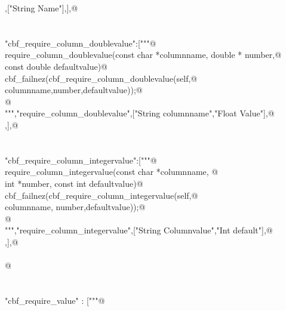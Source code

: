 \documentclass[10pt,a4paper,twoside,notitlepage]{article}
\begin{document}
\begin{flushleft}
\begin{list}{}{}
\mbox{},["String Name"],],@\\
\mbox{}\verb@@\\
\mbox{}\verb@@\\
\mbox{}\verb@"cbf_require_column_doublevalue":["""@\\
\mbox{}\verb@%apply double *OUTPUT { double *number} require_column_doublevalue;@\\
\mbox{}\verb@void require_column_doublevalue(const char *columnname, double * number,@\\
\mbox{}\verb@             const double defaultvalue){@\\
\mbox{}\verb@    cbf_failnez(cbf_require_column_doublevalue(self,@\\
\mbox{}\verb@                  columnname,number,defaultvalue));@\\
\mbox{}\verb@    }@\\
\mbox{}\verb@""","require_column_doublevalue",["String columnname","Float Value"],@\\
\mbox{},],@\\
\mbox{}\verb@@\\
\mbox{}\verb@@\\
\mbox{}\verb@"cbf_require_column_integervalue":["""@\\
\mbox{}\verb@%apply int *OUTPUT {int *number}  require_column_integervalue;@\\
\mbox{}\verb@void require_column_integervalue(const char *columnname, @\\
\mbox{}\verb@                       int *number, const int defaultvalue){@\\
\mbox{}\verb@    cbf_failnez(cbf_require_column_integervalue(self,@\\
\mbox{}\verb@           columnname, number,defaultvalue));@\\
\mbox{}\verb@    }@\\
\mbox{}\verb@""","require_column_integervalue",["String Columnvalue","Int default"],@\\
\mbox{},],@\\
\mbox{}\verb@@\\
\mbox{}\verb@           @\\
\mbox{}\verb@@\\
\mbox{}\verb@@\\
\mbox{}\verb@"cbf_require_value" : ["""@\\
\mbox{}\verb@@\\

\end{list}
\end{flushleft}
\end{document}
